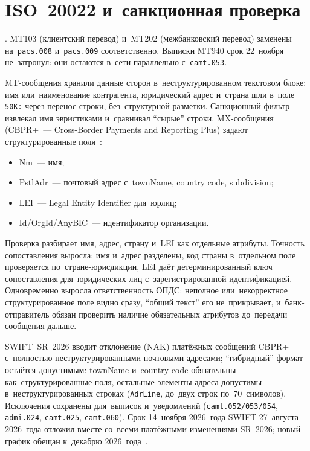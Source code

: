 \section{{ISO}~20022 и~санкционная проверка}\label{sec:sanctions-iso-20022}

. MT103 (клиентский перевод)
и~MT202 (межбанковский перевод) заменены на~\texttt{pacs.008} и~\texttt{pacs.009}
соответственно. Выписки MT940 срок 22~ноября не~затронул: они остаются в~сети
параллельно с~\texttt{camt.053}.

MT-сообщения хранили данные сторон в~неструктурированном текстовом блоке:
имя или~наименование контрагента, юридический адрес и~страна шли в~поле
\texttt{50K:} через перенос строки, без~структурной разметки. Санкционный фильтр извлекал имя эвристиками
и~сравнивал \enquote{сырые} строки. MX-сообщения (CBPR+~--- Cross-Border Payments and
Reporting Plus) задают структурированные поля~\cite{iso-20022-cbpr-plus}:

\begin{itemize}
  \item Nm~--- имя;
  \item PstlAdr~--- почтовый адрес с~townName, country code, subdivision;
  \item LEI~--- Legal Entity Identifier для~юрлиц;
  \item Id/OrgId/AnyBIC~--- идентификатор организации.
\end{itemize}

Проверка разбирает имя, адрес, страну и~LEI как отдельные атрибуты.
Точность сопоставления выросла: имя и~адрес разделены, код страны в~отдельном
поле проверяется по~стране-юрисдикции, LEI даёт детерминированный ключ
сопоставления для~юридических лиц с~зарегистрированной идентификацией.
Одновременно выросла ответственность ОПДС: неполное
или~некорректное структурированное поле видно сразу, \enquote{общий текст}
его не~прикрывает, и~банк-отправитель обязан проверить наличие обязательных атрибутов
до~передачи сообщения дальше.

SWIFT~SR~2026 вводит отклонение (NAK) платёжных сообщений CBPR+ с~полностью
неструктурированными почтовыми адресами; \enquote{гибридный} формат остаётся допустимым:
townName и~country code обязательны как~структурированные поля, остальные
элементы адреса допустимы в~неструктурированных строках (\texttt{AdrLine},
до~двух строк по~70~символов). Исключения сохранены для~выписок и~уведомлений
(\texttt{camt.052/053/054}, \texttt{admi.024}, \texttt{camt.025},
\texttt{camt.060}). Срок 14~ноября 2026~года SWIFT 27~августа 2026~года
отложил вместе со~всеми платёжными изменениями SR~2026; новый график обещан
к~декабрю 2026~года~\cite{redcompass-swift-address-delay-2026}.

